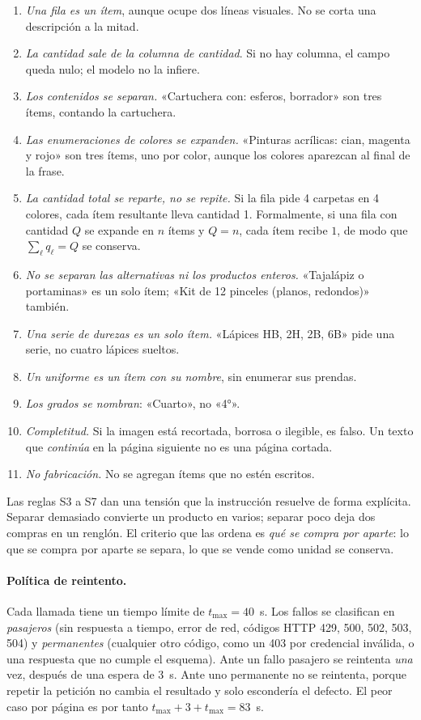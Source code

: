 \begin{enumerate}[label=(S\arabic*)]
  \item \emph{Una fila es un ítem}, aunque ocupe dos líneas visuales. No se
        corta una descripción a la mitad.
  \item \emph{La cantidad sale de la columna de cantidad}. Si no hay columna,
        el campo queda nulo; el modelo no la infiere.
  \item \emph{Los contenidos se separan.} «Cartuchera con: esferos, borrador»
        son tres ítems, contando la cartuchera.
  \item \emph{Las enumeraciones de colores se expanden.} «Pinturas acrílicas:
        cian, magenta y rojo» son tres ítems, uno por color, aunque los colores
        aparezcan al final de la frase.
  \item \emph{La cantidad total se reparte, no se repite.} Si la fila pide 4
        carpetas en 4 colores, cada ítem resultante lleva cantidad 1. Formalmente,
        si una fila con cantidad $Q$ se expande en $n$ ítems y $Q=n$, cada ítem
        recibe $1$, de modo que $\sum_\ell q_\ell = Q$ se conserva.
  \item \emph{No se separan las alternativas ni los productos enteros.}
        «Tajalápiz o portaminas» es un solo ítem; «Kit de 12 pinceles (planos,
        redondos)» también.
  \item \emph{Una serie de durezas es un solo ítem.} «Lápices HB, 2H, 2B, 6B»
        pide una serie, no cuatro lápices sueltos.
  \item \emph{Un uniforme es un ítem con su nombre}, sin enumerar sus prendas.
  \item \emph{Los grados se nombran}: «Cuarto», no «4°».
  \item \emph{Completitud.} Si la imagen está recortada, borrosa o ilegible,
         es falso. Un texto que \emph{continúa} en la página
        siguiente no es una página cortada.
  \item \emph{No fabricación.} No se agregan ítems que no estén escritos.
\end{enumerate}

Las reglas S3 a S7 dan una tensión que la instrucción resuelve de forma
explícita. Separar demasiado convierte un producto en varios; separar poco
deja dos compras en un renglón. El criterio que las ordena es \emph{qué se
compra por aparte}: lo que se compra por aparte se separa, lo que se vende como
unidad se conserva.

\paragraph{Política de reintento.} Cada llamada tiene un tiempo límite de
$t_{\max}=40$~s. Los fallos se clasifican en \emph{pasajeros} (sin respuesta a
tiempo, error de red, códigos HTTP 429, 500, 502, 503, 504) y
\emph{permanentes} (cualquier otro código, como un 403 por credencial
inválida, o una respuesta que no cumple el esquema). Ante un fallo pasajero se
reintenta \emph{una} vez, después de una espera de 3~s. Ante uno permanente no
se reintenta, porque repetir la petición no cambia el resultado y solo
escondería el defecto. El peor caso por página es por tanto
$t_{\max}+3+t_{\max}=83$~s.

